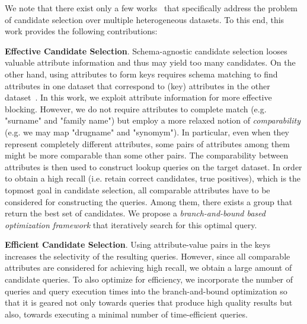  

We note that there exist only a few works~\cite{DBLP:conf/semweb/SongH11,papadakis_efficient_2011} that specifically address the problem of candidate selection over multiple heterogeneous datasets. To this end, this work provides the following contributions: 

\textbf{Effective Candidate Selection}. Schema-agnostic candidate selection looses valuable attribute information and thus may yield too many candidates. On the other hand, using attributes to form keys requires schema matching\cite{DBLP:conf/ic3k/ScharffeE11} to find attributes in one dataset that correspond to (key) attributes in the other dataset~\cite{DBLP:conf/semweb/SongH11}. 
In this work, we exploit attribute information for more effective blocking. However, we do not require attributes to complete match (e.g. "surname" and "family name") but employ a more relaxed notion of \emph{comparability} (e.g. we may map "drugname" and "synomym"). In particular, even when they represent completely different attributes, some pairs of attributes among them might be more comparable than some other pairs. The comparability between attributes is then used to construct lookup queries on the target dataset. In order to obtain a high recall (i.e. retain correct candidates, true positives), which is the topmost goal in candidate selection, all comparable attributes have to be considered for constructing the queries. Among them, there exists a group that return the best set of candidates. We propose a \emph{branch-and-bound based optimization framework} that iteratively search for this optimal query. 

\textbf{Efficient Candidate Selection}. 
Using attribute-value pairs in the keys increases the selectivity of the resulting queries. However, since all comparable attributes are considered for achieving high recall, we obtain a large amount of candidate queries. To also optimize for efficiency, we incorporate the number of queries and query execution times into the branch-and-bound optimization so that it is geared not only towards queries that produce high quality results but also, towards executing a minimal number of time-efficient queries. 

